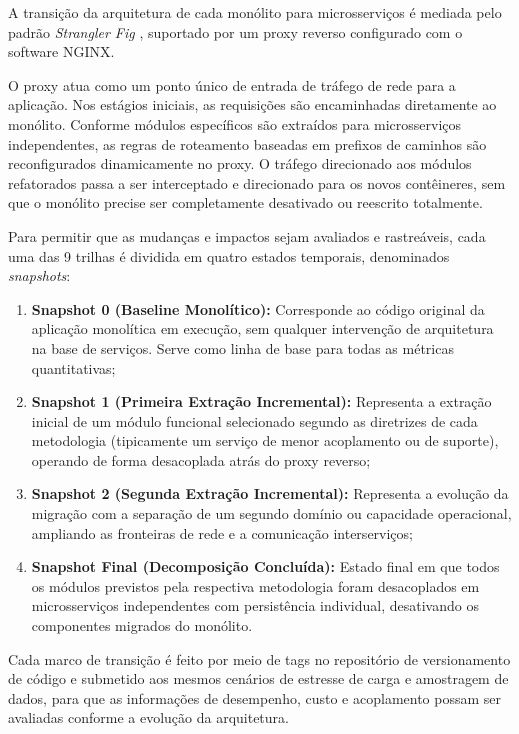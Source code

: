 A transição da arquitetura de cada monólito para microsserviços é mediada pelo padrão \textit{Strangler Fig} \cite{fowler2004}, suportado por um proxy reverso configurado com o software NGINX.

O proxy atua como um ponto único de entrada de tráfego de rede para a aplicação. Nos estágios iniciais, as requisições são encaminhadas diretamente ao monólito. Conforme módulos específicos são extraídos para microsserviços independentes, as regras de roteamento baseadas em prefixos de caminhos são reconfigurados dinamicamente no proxy. O tráfego direcionado aos módulos refatorados passa a ser interceptado e direcionado para os novos contêineres, sem que o monólito precise ser completamente desativado ou reescrito totalmente.

Para permitir que as mudanças e impactos sejam avaliados e rastreáveis, cada uma das 9 trilhas é dividida em quatro estados temporais, denominados \textit{snapshots}:

\begin{enumerate}
    \item \textbf{Snapshot 0 (Baseline Monolítico):} Corresponde ao código original da aplicação monolítica em execução, sem qualquer intervenção de arquitetura na base de serviços. Serve como linha de base para todas as métricas quantitativas;
    
    \item \textbf{Snapshot 1 (Primeira Extração Incremental):} Representa a extração inicial de um módulo funcional selecionado segundo as diretrizes de cada metodologia (tipicamente um serviço de menor acoplamento ou de suporte), operando de forma desacoplada atrás do proxy reverso;
    
    \item \textbf{Snapshot 2 (Segunda Extração Incremental):} Representa a evolução da migração com a separação de um segundo domínio ou capacidade operacional, ampliando as fronteiras de rede e a comunicação interserviços;
    
    \item \textbf{Snapshot Final (Decomposição Concluída):} Estado final em que todos os módulos previstos pela respectiva metodologia foram desacoplados em microsserviços independentes com persistência individual, desativando os componentes migrados do monólito.
\end{enumerate}

Cada marco de transição é feito por meio de tags no repositório de versionamento de código e submetido aos mesmos cenários de estresse de carga e amostragem de dados, para que as informações de desempenho, custo e acoplamento possam ser avaliadas conforme a evolução da arquitetura.



